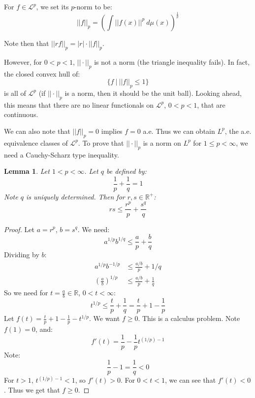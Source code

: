 \documentclass[a4paper,12pt]{report}
\newcommand{\ms}[1]{\mathscr{#1}}
\newtheorem{lemma}[theorem]{Lemma}
\newenvironment{definition}[1][Definition.]{\begin{trivlist}
\item[\hskip \labelsep {\bfseries #1}]}{\end{trivlist}}
\newenvironment{remark}[1][Remark.]{\begin{trivlist}
\item[\hskip \labelsep {\bfseries #1}]}{\end{trivlist}}
\begin{document}
	\begin{definition}
	For $f \in \ms{L}^p$, we set its $p$-norm to be:
	\[ ||f||_p = \left( \int ||f(x)||^p ~ d\mu(x) \right)^{\frac{1}{p}} \]
	\end{definition}
	
	\begin{remark}
	Note then that $||rf||_p = |r|\cdot ||f||_p$. 
	\end{remark}
	
	\noindent However, for $0 < p < 1$, $||\cdot||_p$ is not a norm (the triangle inequality fails). In fact, the closed convex hull of:
	\[ \{ f ~|~ ||f||_p \leq 1 \} \]
	is all of $\ms{L}^p$ (if $||\cdot||_p$ is a norm, then it should be the unit ball). Looking ahead, this means that there are no linear functionals on $\ms{L}^p$, $0 < p < 1$, that are continuous. 
	
	We can also note that $||f||_p = 0$ implies $f = 0$ a.e. Thus we can obtain $L^p$, the a.e. equivalence classes of $\ms{L}^p$. To prove that $||\cdot||_p$ is a norm on $L^p$ for $1 \leq p < \infty$, we need a Cauchy-Scharz type inequality.
	
	\begin{lemma}
	Let $1 < p < \infty$. Let $q$ be defined by:
	\[ \frac{1}{p} + \frac{1}{q} = 1 \]
	Note $q$ is uniquely determined. Then for $r, s \in \mathbb{R}^+$:
	\[ rs \leq \frac{r^p}{p} + \frac{s^q}{q} \]
	\end{lemma} 
	\begin{proof}
	Let $a = r^p$, $b = s^q$. We need:
	\[ a^{1/p}b^{1/q} \leq \frac{a}{p} + \frac{b}{q} \]
	Dividing by $b$:
	\begin{align*}
	a^{1/p}b^{-1/p} &\leq \frac{a/b}{p} + 1/q \\
	\left(\frac{a}{b}\right)^{1/p} &\leq \frac{a/b}{p} + \frac{1}{q}
	\end{align*}
	So we need for $t = \frac{a}{b} \in \mathbb{R}$, $0 < t < \infty$:
	\[ t^{1/p} \leq \frac{t}{p} + \frac{1}{q} = \frac{t}{p} + 1 - \frac{1}{p} \]
	Let $f(t) = \frac{t}{p} + 1 - \frac{1}{p} - t^{1/p}$. We want $f \geq 0$. This is a calculus problem. Note $f(1) = 0$, and:
	\[ f'(t) = \frac{1}{p} - \frac{1}{p} t^{(1/p) - 1} \]
	Note:
	\[ \frac{1}{p} - 1 = \frac{1}{q} < 0 \]
	For $t > 1$, $t^{(1/p) - 1} < 1$, so $f'(t) > 0$. For $0 < t < 1$, we can see that $f'(t) < 0$. Thus we get that $f \geq 0$. 
	\end{proof}
\end{document}
